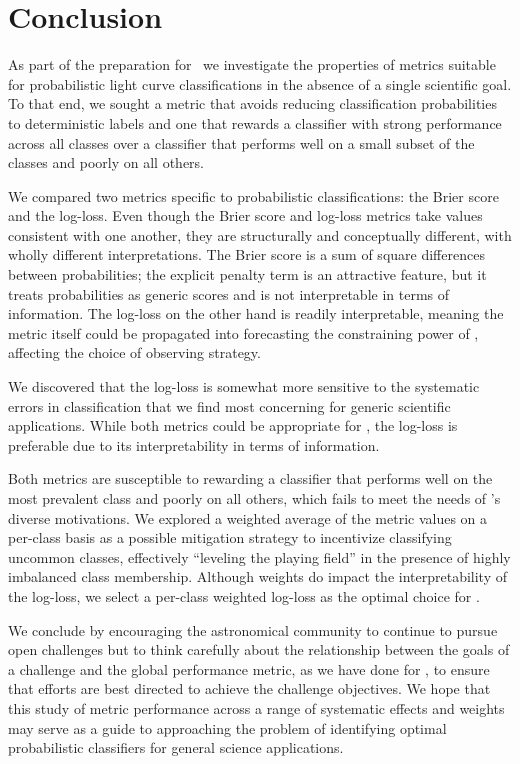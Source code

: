 \section{Conclusion}
\label{sec:conclusion}

As part of the preparation for \plasticc\, we investigate the properties of metrics suitable for probabilistic light curve classifications in the absence of a single scientific goal.
To that end, we sought a metric that avoids reducing classification probabilities to deterministic labels and one that rewards a classifier with strong performance across all classes over a classifier that performs well on a small subset of the classes and poorly on all others.

We compared two metrics specific to probabilistic classifications: the Brier score and the log-loss.
Even though the Brier score and log-loss metrics take values consistent with one another, they are structurally and conceptually different, with wholly different interpretations.
The Brier score is a sum of square differences between probabilities; the explicit penalty term is an attractive feature, but it treats probabilities as generic scores and is not interpretable in terms of information.
The log-loss on the other hand is readily interpretable, meaning the metric itself could be propagated into forecasting the constraining power of \lsst, affecting the choice of observing strategy.

We discovered that the log-loss is somewhat more sensitive to the systematic errors in classification that we find most concerning for generic scientific applications.
While both metrics could be appropriate for \plasticc, the log-loss is preferable due to its interpretability in terms of information.

Both metrics are susceptible to rewarding a classifier that performs well on the most prevalent class and poorly on all others, which fails to meet the needs of \plasticc's diverse motivations.
We explored a weighted average of the metric values on a per-class basis as a possible mitigation strategy to incentivize classifying uncommon classes, effectively ``leveling the playing field'' in the presence of highly imbalanced class membership.
Although weights do impact the interpretability of the log-loss, we select a per-class weighted log-loss as the optimal choice for \plasticc.


We conclude by encouraging the astronomical community to continue to pursue open challenges but to think carefully about the relationship between the goals of a challenge and the global performance metric, as we have done for \plasticc, to ensure that efforts are best directed to achieve the challenge objectives.
We hope that this study of metric performance across a range of systematic effects and weights may serve as a guide to approaching the problem of identifying optimal probabilistic classifiers for general science applications.
